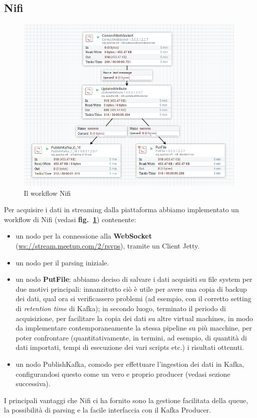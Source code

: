 \documentclass[fleqn,10pt]{SelfArx} %
\begin{document}
{\subsection{Nifi}%
\begin{figure}
\includegraphics[scale=0.3]{images/nifi_workflow.png}
\caption{\label{nifi_workflow} Il workflow Nifi}
\end{figure}
Per acquisire i dati in streaming dalla piattaforma abbiamo implementato un workflow di Nifi (vedasi \textbf{fig.~\ref{nifi_workflow}}) contenente: 
\begin{itemize} %
\item un nodo per la connessione alla \textbf{WebSocket} (\url{ws://stream.meetup.com/2/rsvps}), tramite un Client Jetty. 
\item un nodo per il parsing iniziale.
\item un nodo \textbf{PutFile}: abbiamo deciso di salvare i dati acquisiti su file system per due motivi principali: innanzitutto ciò è utile per avere una copia di backup dei dati, qual ora si verificassero problemi (ad esempio, con il corretto setting di \textit{retention time} di Kafka); in secondo luogo, terminato il periodo di acquisizione, per facilitare la copia dei dati su altre virtual machines, in modo da implementare contemporaneamente la stessa pipeline su più macchine, per poter confrontare (quantitativamente, in termini, ad esempio, di quantità di dati importati, tempi di esecuzione dei vari scripts etc.) i risultati ottenuti.
\item un nodo PublishKafka, comodo per effettuare l'ingestion dei dati in Kafka, configurandosi questo come un vero e proprio producer (vedasi sezione successiva). %
\end{itemize} 
I principali vantaggi che Nifi ci ha fornito sono la gestione facilitata della queue, la possibilità di parsing e la facile interfaccia con il Kafka Producer.
}
\end{document}
